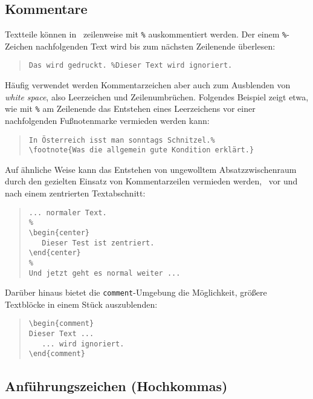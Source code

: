 \subsection{Kommentare}
\label{sec:kommentare}


Textteile können in \latex\ zeilenweise mit \verb!%! auskommentiert werden.
Der einem \verb!%!-Zeichen nachfolgenden Text wird bis zum nächsten
Zeilenende überlesen:
%
\begin{quote}
    \verb!Das wird gedruckt. %Dieser Text wird ignoriert.!
\end{quote}
%
Häufig verwendet werden Kommentarzeichen aber auch zum Ausblenden von
\emph{white space}, also Leerzeichen und Zeilenumbrüchen. Folgendes Beispiel
zeigt etwa, wie mit \verb!%! am Zeilenende das Entstehen eines Leerzeichens
vor einer nachfolgenden Fußnotenmarke vermieden werden kann:
%
\begin{quote}
\begin{verbatim}
In Österreich isst man sonntags Schnitzel.%
\footnote{Was die allgemein gute Kondition erklärt.}
\end{verbatim}
\end{quote}
%

\begin{sloppypar}
    \noindent
    Auf ähnliche Weise kann das Entstehen von ungewolltem Absatzzwischenraum
    durch den gezielten Einsatz von Kommentarzeilen vermieden werden, \zB\
    vor und nach einem zentrierten Textabschnitt:
\end{sloppypar}
%
\begin{quote}
\begin{verbatim}
... normaler Text.
%
\begin{center}
   Dieser Test ist zentriert.
\end{center}
%
Und jetzt geht es normal weiter ...
\end{verbatim}
\end{quote}
%
Darüber hinaus bietet die \verb!comment!-Umgebung die Möglichkeit, größere
Text\-blöcke in einem Stück auszublenden:
%
\begin{quote}
\begin{verbatim}
\begin{comment}
Dieser Text ...
   ... wird ignoriert.
\end{comment}
\end{verbatim}
\end{quote}

\subsection{Anführungszeichen (Hochkommas)}
\label{sec:anfuehrungszeichen}

